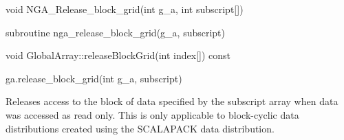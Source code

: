 \documentclass[12pt]{article}
\begin{document}
\begin{capi}
\begin{ccode}
void NGA_Release_block_grid(int g_a, int subscript[])
\end{ccode}
\begin{funcargs}
\end{funcargs}
\end{capi}

\begin{fapi}
\begin{fcode}
subroutine nga_release_block_grid(g_a, subscript)
\end{fcode}
\begin{funcargs}
\end{funcargs}
\end{fapi}

\begin{cxxapi}
\begin{cxxcode}
void GlobalArray::releaseBlockGrid(int index[]) const
\end{cxxcode}
\begin{funcargs}
\end{funcargs}
\end{cxxapi}

\begin{pyapi}
\begin{pycode}
ga.release_block_grid(int g_a, subscript)
\end{pycode}
\begin{funcargs}
\end{funcargs}
\end{pyapi}

\local

\begin{desc}

Releases access to the block of data specified by the subscript array when data
was accessed as read only. This is only applicable to block-cyclic data
distributions created using the SCALAPACK data distribution.

\end{desc}

\end{document}
